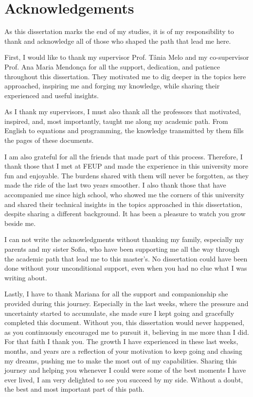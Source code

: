 \chapter*{Acknowledgements}

As this dissertation marks the end of my studies, it is of my responsibility to thank and acknowledge all of those who shaped the path that lead me here.
\par
First, I would like to thank my supervisor Prof. Tânia Melo and my co-supervisor Prof. Ana Maria Mendonça for all the support, dedication, and patience throughout this dissertation. They motivated me to dig deeper in the topics here approached, inspiring me and forging my knowledge, while sharing their experienced and useful insights.
\par
As I thank my supervisors, I must also thank all the professors that motivated, inspired, and, most importantly, taught me along my academic path. From English to equations and programming, the knowledge transmitted by them fills the pages of these documents.
\par
I am also grateful for all the friends that made part of this process. Therefore, I thank those that I met at FEUP and made the experience in this university more fun and enjoyable. The burdens shared with them will never be forgotten, as they made the ride of the last two years smoother. I also thank those that have accompanied me since high school, who showed me the corners of this university and shared their technical insights in the topics approached in this dissertation, despite sharing a different background. It has been a pleasure to watch you grow beside me.
\par
I can not write the acknowledgments without thanking my family, especially my parents and my sister Sofia, who have been supporting me all the way through the academic path that lead me to this master's. No dissertation could have been done without your unconditional support, even when you had no clue what I was writing about.
\par
Lastly, I have to thank Mariana for all the support and companionship she provided during this journey. Especially in the last weeks, where the pressure and uncertainty started to accumulate, she made sure I kept going and gracefully completed this document. Without you, this dissertation would never happened, as you continuously encouraged me to pursuit it, believing in me more than I did. For that faith I thank you. The growth I have experienced in these last weeks, months, and years are a reflection of your motivation to keep going and chasing my dreams, pushing me to make the most out of my capabilities. Sharing this journey and helping you whenever I could were some of the best moments I have ever lived, I am very delighted to see you succeed by my side. Without a doubt, the best and most important part of this path.

\vspace{10mm}
